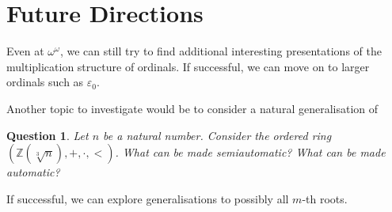 \documentclass[british,a4paper,]{scrartcl}
\newtheorem{question}[theorem]{Question}
\theoremstyle{definition}
\theoremstyle{remark}
\let\epsilon\varepsilon
\newcommand{\Z}{\mathbb{Z}}
\begin{document}
\section{Future Directions}

Even at \(\omega^\omega\), we can still try to find additional interesting presentations of the multiplication structure of ordinals.
If successful, we can move on to larger ordinals such as \(\epsilon_0\).

Another topic to investigate would be to consider a natural generalisation of 
\begin{question}
    Let \(n\) be a natural number.
    Consider the ordered ring \((\Z(\sqrt[3]{n}), +, \cdot, <)\).
    What can be made semiautomatic? What can be made automatic?
\end{question}
If successful, we can explore generalisations to possibly all \(m\)-th roots.

\printbibliography
\end{document}
